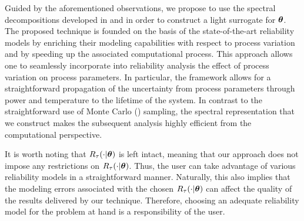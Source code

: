 Guided by the aforementioned observations, we propose to use the spectral decompositions developed in  and  in order to construct a light surrogate for $\bm{\theta}$.
The proposed technique is founded on the basis of the state-of-the-art reliability models by enriching their modeling capabilities with respect to process variation and by speeding up the associated computational process.
This approach allows one to seamlessly incorporate into reliability analysis the effect of process variation on process parameters.
In particular, the framework allows for a straightforward propagation of the uncertainty from process parameters through power and temperature to the lifetime of the system.
In contrast to the straightforward use of Monte Carlo () sampling, the spectral representation that we construct makes the subsequent analysis highly efficient from the computational perspective.

It is worth noting that $R_\tau(\cdot | \bm{\theta})$ is left intact, meaning that our approach does not impose any restrictions on $R_\tau(\cdot | \bm{\theta})$.
Thus, the user can take advantage of various reliability models in a straightforward manner.
Naturally, this also implies that the modeling errors associated with the chosen $R_\tau(\cdot | \bm{\theta})$ can affect the quality of the results delivered by our technique.
Therefore, choosing an adequate reliability model for the problem at hand is a responsibility of the user.
